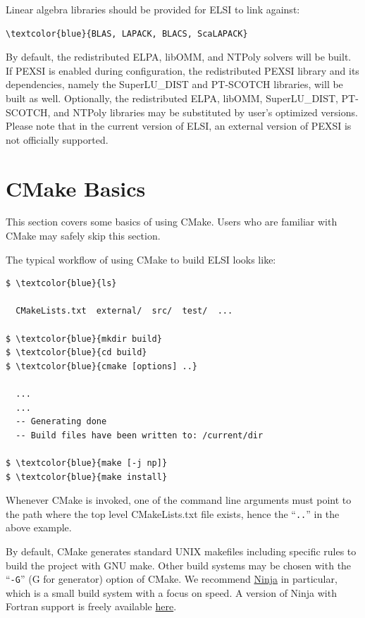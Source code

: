 \documentclass{report}
\begin{document}
Linear algebra libraries should be provided for ELSI to link against:
\begin{Verbatim}[commandchars=\\\{\}]
\textcolor{blue}{BLAS, LAPACK, BLACS, ScaLAPACK}
\end{Verbatim}

By default, the redistributed ELPA, libOMM, and NTPoly solvers will be built.  If PEXSI is enabled during configuration, the redistributed PEXSI library and its dependencies, namely the SuperLU\_DIST and PT-SCOTCH libraries, will be built as well.  Optionally, the redistributed ELPA, libOMM, SuperLU\_DIST, PT-SCOTCH, and NTPoly libraries may be substituted by user's optimized versions.  Please note that in the current version of ELSI, an external version of PEXSI is not officially supported.

\section{CMake Basics}
\label{sec:cmake}
This section covers some basics of using CMake.  Users who are familiar with CMake may safely skip this section.

The typical workflow of using CMake to build ELSI looks like:
\begin{tcolorbox}
\begin{Verbatim}[commandchars=\\\{\}]
$ \textcolor{blue}{ls}

  CMakeLists.txt  external/  src/  test/  ...

$ \textcolor{blue}{mkdir build}
$ \textcolor{blue}{cd build}
$ \textcolor{blue}{cmake [options] ..}

  ...
  ...
  -- Generating done
  -- Build files have been written to: /current/dir

$ \textcolor{blue}{make [-j np]}
$ \textcolor{blue}{make install}
\end{Verbatim}
\end{tcolorbox}

Whenever CMake is invoked, one of the command line arguments must point to the path where the top level CMakeLists.txt file exists, hence the ``\verb+..+'' in the above example.

By default, CMake generates standard UNIX makefiles including specific rules to build the project with GNU make.  Other build systems may be chosen with the ``\verb+-G+'' (G for generator) option of CMake.  We recommend \href{http://ninja-build.org}{Ninja} in particular, which is a small build system with a focus on speed.  A version of Ninja with Fortran support is freely available \href{http://github.com/Kitware/ninja}{here}.
\end{document}
